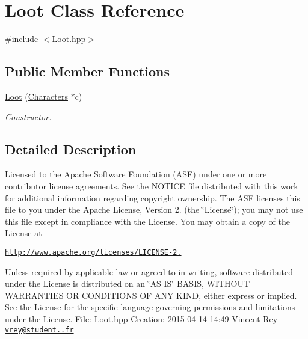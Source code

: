 \hypertarget{class_loot}{\section{Loot Class Reference}
\label{class_loot}
}


{\ttfamily \#include $<$Loot.\+hpp$>$}

\subsection*{Public Member Functions}
\begin{DoxyCompactItemize}
\item 
\hyperlink{class_loot_af626b2c872cc8d82c8652d5124c87354}{Loot} (\hyperlink{class_characters}{Characters} $\ast$c)
\begin{DoxyCompactList}\small\item\em Constructor. \end{DoxyCompactList}\end{DoxyCompactItemize}


\subsection{Detailed Description}
Licensed to the Apache Software Foundation (A\+S\+F) under one or more contributor license agreements. See the N\+O\+T\+I\+C\+E file distributed with this work for additional information regarding copyright ownership. The A\+S\+F licenses this file to you under the Apache License, Version 2. (the \char`\"{}\+License\char`\"{}); you may not use this file except in compliance with the License. You may obtain a copy of the License at

\href{http://www.apache.org/licenses/LICENSE-2.0}{\tt http\+://www.\+apache.\+org/licenses/\+L\+I\+C\+E\+N\+S\+E-\/2.}

Unless required by applicable law or agreed to in writing, software distributed under the License is distributed on an \char`\"{}\+A\+S I\+S\char`\"{} B\+A\+S\+I\+S, W\+I\+T\+H\+O\+U\+T W\+A\+R\+R\+A\+N\+T\+I\+E\+S O\+R C\+O\+N\+D\+I\+T\+I\+O\+N\+S O\+F A\+N\+Y K\+I\+N\+D, either express or implied. See the License for the specific language governing permissions and limitations under the License. File\+: \hyperlink{_loot_8hpp_source}{Loot.\+hpp} Creation\+: 2015-\/04-\/14 14\+:49 Vincent Rey \href{mailto:vrey@student.42.fr}{\tt vrey@student..\+fr} 


